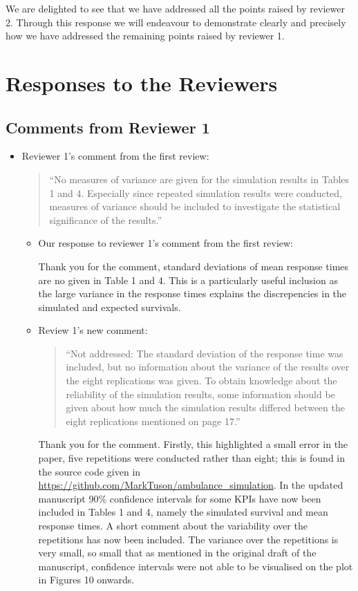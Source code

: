 \documentclass{article}
\begin{document}
We are delighted to see that we have addressed all the points raised by reviewer
2. Through this response we will endeavour to demonstrate clearly and precisely
how we have addressed the remaining points raised by reviewer 1.

\section{Responses to the Reviewers}

\subsection{Comments from Reviewer 1}

\begin{itemize}
    \item Reviewer 1's comment from the first review:

    \begin{quote}
    ``No measures of variance are given for the simulation results in Tables 1 and 4. Especially since repeated simulation results were conducted, measures of variance should be included to investigate the statistical significance of the results.''
    \end{quote}

    \begin{itemize}
        \item Our response to reviewer 1's comment from the first review:

        Thank you for the comment, standard deviations of mean response times are no
        given in Table 1 and 4. This is a particularly useful inclusion as the
        large variance in the response times explains the discrepencies in the
        simulated and expected survivals.

        \item Review 1's new comment:

        \begin{quote}
        ``Not addressed: The standard deviation of the response time was included, but no information about the variance of the results over the eight
        replications was given. To obtain knowledge about the reliability of the
        simulation results, some information should be given about how much the
        simulation results differed between the eight replications mentioned on
        page 17.''
        \end{quote}

        Thank you for the comment. Firstly, this highlighted a small error in the paper, five repetitions were conducted rather than eight; this is found in the source code given in \url{https://github.com/MarkTuson/ambulance_simulation}. In the updated manuscript 90\% confidence intervals for some KPIs have now been included in Tables 1 and 4, namely the simulated survival and mean response times. A short comment about the variability over the repetitions has now been included. The variance over the repetitions is very small, so small that as mentioned in the original draft of the manuscript, confidence intervals were not able to be visualised on the plot in Figures 10 onwards.
    \end{itemize}


\end{itemize}
\end{document}
